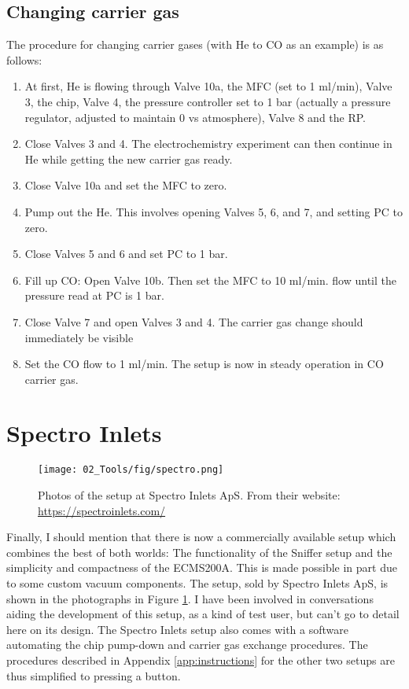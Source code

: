 \subsection{Changing carrier gas}
The procedure for changing carrier gases (with He to CO as an example) is as follows:
\begin{enumerate}
	\item At first, He is flowing through Valve 10a, the MFC (set to 1 ml/min), Valve 3, the chip, Valve 4, the pressure controller set to 1 bar (actually a pressure regulator, adjusted to maintain 0 vs atmosphere), Valve 8 and the RP. 
	
	\item Close Valves 3 and 4. The electrochemistry experiment can then continue in He while getting the new carrier gas ready.
	
	\item Close Valve 10a and set the MFC to zero.
	
	\item Pump out the He. This involves opening Valves 5, 6, and 7, and setting PC to zero.
	
	\item Close Valves 5 and 6 and set PC to 1 bar.
	
	\item Fill up CO: Open Valve 10b. Then set the MFC to 10 ml/min. flow until the pressure read at PC is 1 bar.
	
	\item Close Valve 7 and open Valves 3 and 4. The carrier gas change should immediately be visible 
	
	\item Set the CO flow to 1 ml/min. The setup is now in steady operation in CO carrier gas.
\end{enumerate}



\section{Spectro Inlets}\label{app:spectro}

\begin{figure}[h!]
	\centering
	\texttt{[image: 02\_Tools/fig/spectro.png]}
	\caption{Photos of the setup at Spectro Inlets ApS. From their website: \url{https://spectroinlets.com/}}
	\label{fig:spectro}
\end{figure}
Finally, I should mention that there is now a commercially available setup which combines the best of both worlds: The functionality of the Sniffer setup and the simplicity and compactness of the ECMS200A. This is made possible in part due to some custom vacuum components. The setup, sold by Spectro Inlets ApS, is shown in the photographs in Figure \ref{fig:spectro}. I have been involved in conversations aiding the development of this setup, as a kind of test user, but can't go to detail here on its design. The Spectro Inlets setup also comes with a software automating the chip pump-down and carrier gas exchange procedures. The procedures described in Appendix \ref{app:instructions} for the other two setups are thus simplified to pressing a button.



